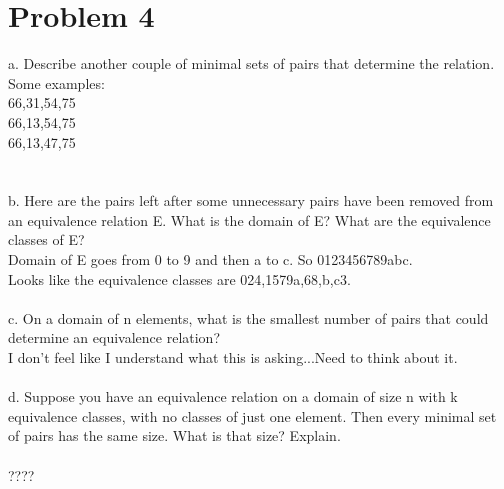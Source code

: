 \documentclass{article}
\begin{document}
\section{Problem 4}
a. Describe another couple of minimal sets of pairs that determine the relation.
\\
Some examples:
\\
{66,31,54,75}\\
{66,13,54,75}\\
{66,13,47,75}\\
\\\\
b. Here are the pairs left after some unnecessary pairs have been removed from an equivalence relation E. What is the domain of E? What are the equivalence classes of E?
\\
Domain of E goes from 0 to 9 and then a to c. So {0123456789abc}.\\ Looks like the equivalence classes are {024},{1579a},{68},{b},{c3}. 
\\\\
c. On a domain of n elements, what is the smallest number of pairs that could determine an equivalence relation?
\\
I don't feel like I understand what this is asking...Need to think about it.
\\\\
d. Suppose you have an equivalence relation on a domain of size n with k equivalence classes,
with no classes of just one element. Then every minimal set of pairs has the same size. What is
that size? Explain.
\\\\
????
\end{document}
